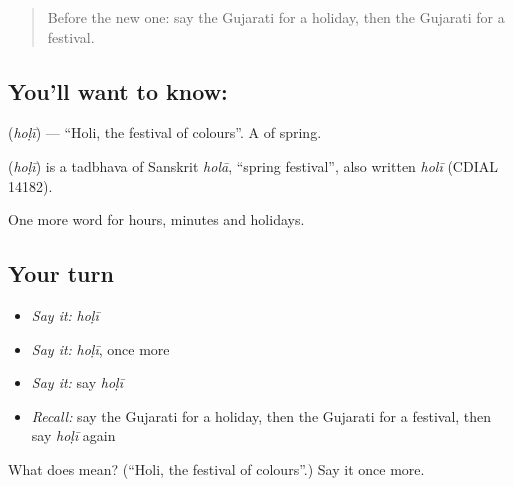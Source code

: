 \label{lesson:GU-C80-holi}



\begin{quote}
Before the new one: say the Gujarati for a holiday, then the Gujarati for a festival.
\end{quote}

\subsection*{You'll want to know: }
\textbf{} (\emph{hoḷī}) — \textquotedblleft{}Holi, the festival of colours\textquotedblright{}. A \textbf{} of spring.

\begin{cousinweb}
\textbf{} (\emph{hoḷī}) is a tadbhava of Sanskrit \emph{holā}, \textquotedblleft{}spring festival\textquotedblright{}, also written \emph{holī} (CDIAL 14182).
\end{cousinweb}

\begin{grammarlens}[title={What you've built}]
One more word for hours, minutes and holidays.
\end{grammarlens}

\subsection*{Your turn}
\begin{itemize}
\raggedright
  \item \emph{Say it:} \emph{hoḷī}
  \item \emph{Say it:} \emph{hoḷī}, once more
  \item \emph{Say it:} say \emph{hoḷī}
  \item \emph{Recall:} say the Gujarati for a holiday, then the Gujarati for a festival, then say \emph{hoḷī} again
\end{itemize}

\begin{tcolorbox}[breakable,colback=teal!4,colframe=teal!35!black,title={Before you move on}]
What does  mean? (\textquotedblleft{}Holi, the festival of colours\textquotedblright{}.) Say it once more.
\end{tcolorbox}
